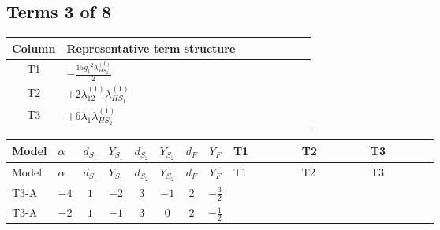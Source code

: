 \documentclass[8pt]{article}
\begin{document}
\begin{landscape}
\subsection*{Terms 3 of 8}
\begin{center}
\begin{tabular}{@{}c >{\raggedright\arraybackslash}p{0.82\linewidth}@{}}
\toprule
Column & Representative term structure \\
\midrule
T1 & \(\displaystyle -\frac{15 {g_1}^2 {\lambda_{HS_2}^{(1)}}}{2}\) \\
\midrule
T2 & \(\displaystyle +2 {\lambda_{12}^{(1)}} {\lambda_{HS_1}^{(1)}}\) \\
\midrule
T3 & \(\displaystyle +6 {\lambda_1} {\lambda_{HS_2}^{(1)}}\) \\
\midrule
\bottomrule
\end{tabular}
\end{center}
\smallskip
\tiny
\begin{longtable}{@{}llcccccc >{\raggedright\arraybackslash}p{0.21\linewidth} >{\raggedright\arraybackslash}p{0.21\linewidth} >{\raggedright\arraybackslash}p{0.21\linewidth}@{}}
\toprule
Model & $\alpha$ & $d_{S_1}$ & $Y_{S_1}$ & $d_{S_2}$ & $Y_{S_2}$ & $d_F$ & $Y_F$ & T1 & T2 & T3 \\
\midrule
\endfirsthead
\toprule
Model & $\alpha$ & $d_{S_1}$ & $Y_{S_1}$ & $d_{S_2}$ & $Y_{S_2}$ & $d_F$ & $Y_F$ & T1 & T2 & T3 \\
\midrule
\endhead
T3-A & $-4$ & $1$ & $-2$ & $3$ & $-1$ & $2$ & $-\frac{3}{2}$ & \scriptsize\adjustbox{max width=\linewidth}{$\begin{gathered} -\frac{15 {g_1}^2 {\lambda_{HS_2}^{(1)}}}{2}\end{gathered}$} & \scriptsize\adjustbox{max width=\linewidth}{$\begin{gathered} +2 {\lambda_{12}^{(1)}} {\lambda_{HS_1}^{(1)}}\end{gathered}$} & \scriptsize\adjustbox{max width=\linewidth}{$\begin{gathered} +6 {\lambda_1} {\lambda_{HS_2}^{(1)}}\end{gathered}$} \\
\midrule
T3-A & $-2$ & $1$ & $-1$ & $3$ & $0$ & $2$ & $-\frac{1}{2}$ & \scriptsize\adjustbox{max width=\linewidth}{$\begin{gathered} -\frac{3 {g_1}^2 {\lambda_{HS_2}^{(1)}}}{2}\end{gathered}$} & \scriptsize\adjustbox{max width=\linewidth}{$\begin{gathered} +2 {\lambda_{12}^{(1)}} {\lambda_{HS_1}^{(1)}}\end{gathered}$} & \scriptsize\adjustbox{max width=\linewidth}{$\begin{gathered} +6 {\lambda_1} {\lambda_{HS_2}^{(1)}}\end{gathered}$} \\

\end{longtable}
\end{landscape}
\end{document}
